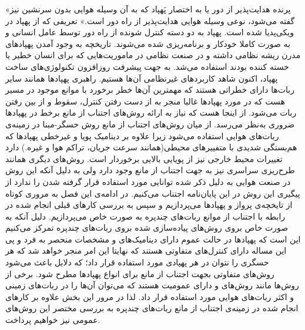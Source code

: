 «پرنده هدایت‌پذیر از دور یا به اختصار پَهپاد که به آن وسیله هوایی بدون سرنشین نیز گفته می‌شود، نوعی وسیله هوایی هدایت‌پذیر از راه دور است.» تعریفی که از پهپاد در ویکی‌پدیا شده است. پهپاد به دو دسته کنترل شونده از راه دور توسط عامل انسانی و به صورت کاملا خودکار و برنامه‌ریزی شده می‌شوند. تاریخچه به وجود آمدن پهپادهای مدرن ریشه نظامی داشته و در صنعت نظامی در ماموریت‌هایی که برای انسان خطیر یا خسته کننده بودند استفاده می‌شد. به جهت پیشرفت روزافزون تکنولوژی‌های ساخت پهپاد، اکنون شاهد کاربردهای غیرنظامی آن‌ها هستیم. راهبری پهپادها همانند سایر ربات‌ها دارای خطراتی هستند که مهمترین آن‌ها خطر برخورد با موانع موجود در مسیر هست که در مورد پهپادها غالبا منجر به از دست رفتن کنترل، سقوط و از بین رفتن ربات می‌شود. از اینجا هست که نیاز به ارائه روش‌های اجتناب از مانع برخط در پهپادها ضروری به‌نظر می‌رسد. از میان روش‌های اجتناب از مانع روش حسگر-مبنا در زمینه‌ی ربات‌های هوایی استفاده می‌شود زیرا علاوه بر دینامیک پویا و غیرخطی پهپادها که هم‌بستگی شدیدی با متفییرهای محیطی(همانند سرعت جریان، تراکم هوا و غیره.) دارد تغییرات محیط خارجی نیز از پویایی بالایی برخوردار است. روش‌های دیگری همانند طرح‌ریزی سراسری نیز به جهت اجتناب از مانع وجود دارد ولی به دلیل آنکه این روش در صنعت هوایی به دلیل ذکر شده توانایی مورد استفاده قرار گرفته شدن را ندارد از پیگیری این روش در این پایان‌نامه اجتناب می‌کنیم.
در ادامه‌ی این فصل به مروری کوتاه از تایخچه‌ی پرواز و پهپادها می‌پردازیم و سپس به بررسی کارهای قبلی انجام شده در رابطه با اجتناب از موانع ربات‌های چندپره به صورت خاص می‌پردازیم. دلیل آنکه به صورت خاص بروی روش‌های پیاده‌سازی شده بروی ربات‌های چندپره تمرکز می‌کنیم این است که پهپادها در حالت عموم دارای دینامیک‌های و مشخصات منحصر به فرد و پی این مساله دارای کنترل‌های متفاوتی هستند که نهایتا این امر منجر خواهد شد که هر حسگری را نتوان در هر پهپادی مورد استفاده قرار داد؛ که دلایل باعث می‌شود روش‌های متفاوتی بجهت اجتناب از مانع برای انواع پهپادها مطرح شود. برخی از روش‌ها مانند روش‌های  و  دارای عمومیت هستند که می‌توان آن‌ها را در ربات‌های زمینی و اکثر ربات‌های هوایی مورد استفاده قرار داد. لذا در مرور این بخش علاوه بر کارهای انجام شده در زمینه‌ی اجتناب از مانع ربات‌های چندپره به بررسی مختصر این روش‌های عمومی نیز خواهیم پرداخت.